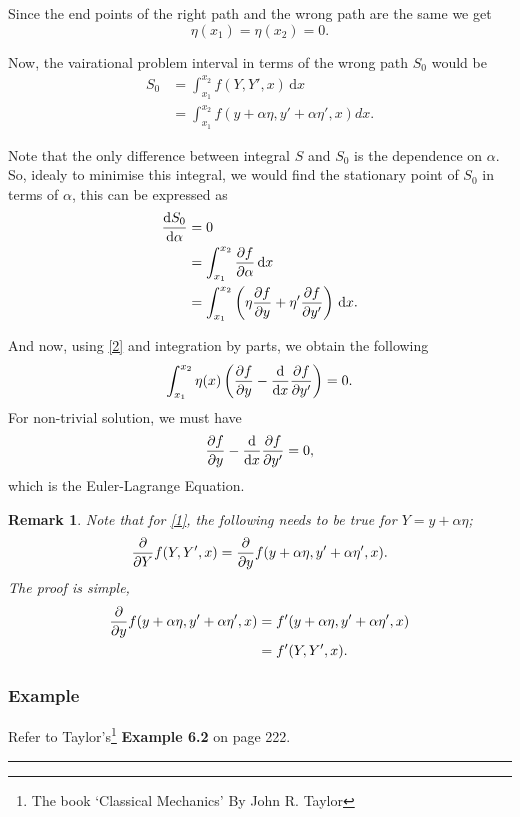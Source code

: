 \documentclass[a4paper]{article}
\newcommand{\dmr}[1]{\, \mathrm{d}#1} %
\newcommand{\intt}[2]{\int_{#1}^{#2}} %
\newtheorem{remark}{Remark}[subsubsection]
\numberwithin{equation}{subsection}
\begin{document}
Since the end points of the right path and the wrong path are the same we get
\begin{equation}
    \eta(x_1) = \eta(x_2) = 0.\label{2}    
\end{equation}

Now, the vairational problem interval in terms of the wrong path $S_0$ would be
\begin{align}
    S_0 &= \intt{x_1}{x_2} f(Y,Y',x) \dmr{x} \nonumber \\
    &= \intt{x_1}{x_2} f(y+\alpha \eta, y' + \alpha \eta', x)dx.
\end{align}

Note that the only difference between integral $S$ and $S_0$ is the dependence on $\alpha$. So, idealy to minimise this integral, we would find the stationary point of $S_0$ in terms of $\alpha$, this can be expressed as 
\begin{align}
    \dv{S_0}{\alpha} &= 0 \nonumber \\
    &= \intt{x_1}{x_2} \pdv{f}{\alpha} \dmr{x} \nonumber \\
    &= \intt{x_1}{x_2} \left(\eta \pdv{f}{y} + \eta' \pdv{f}{y'} \right) \dmr{x}.\label{1}
\end{align}

And now, using \eqref{2} and integration by parts, we obtain the following
\begin{equation}
    \intt{x_1}{x_2}\eta(x)\left(\pdv{f}{y}-\dv{x}\pdv{f}{y'}\right) = 0.
\end{equation}
For non-trivial solution, we must have 
\[
    \pdv{f}{y}-\dv{x}\pdv{f}{y'} = 0,
\]
which is the Euler-Lagrange Equation.

\begin{remark}
    Note that for \eqref{1}, the following needs to be true for $Y = y + \alpha \eta$;
    \[
        \pdv{}{Y} f(Y,Y',x) = \pdv{}{y} f(y+\alpha \eta, y'+\alpha \eta', x).
    \]
    The proof is simple,
    \begin{align*}
        \pdv{}{y} f(y+\alpha \eta, y'+\alpha \eta', x) &= f'(y+\alpha \eta, y'+\alpha \eta', x) \\
        &= f'(Y, Y', x).
    \end{align*}
\end{remark}

\subsubsection{Example}
Refer to Taylor's\footnote{The book `Classical Mechanics'\cite{TaylorJohnR.JohnRobert2005Cm} By John R. Taylor} \textbf{Example 6.2} on page 222.
\par\noindent\rule{\textwidth}{0.4pt}
\end{document}

